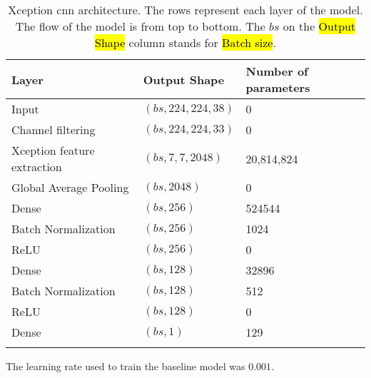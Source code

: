 \begin{longtable}{m{\mylengtha} | m{\mylengthb} | m{\mylengthc}}
    \hline
    Layer & Output Shape & Number of parameters \\
    \hline
    Input & $(bs, 224, 224, 38)$ & 0 \\
    \hline
    Channel filtering & $(bs, 224, 224, 33)$ & 0 \\
    \hline
    Xception feature extraction & $(bs, 7, 7, 2048)$ & 20,814,824 \\
    \hline
    Global Average Pooling & $(bs, 2048)$ & 0 \\
    \hline
    Dense & $(bs, 256)$ & 524544 \\
    \hline
    Batch Normalization & $(bs, 256)$ & 1024 \\
    \hline
    ReLU & $(bs, 256)$ & 0 \\
    \hline
    Dense & $(bs, 128)$ & 32896 \\
    \hline
    Batch Normalization & $(bs, 128)$ & 512 \\
    \hline
    ReLU & $(bs, 128)$ & 0 \\
    \hline
    Dense & $(bs, 1)$ & 129 \\
    \hline
  \caption{Xception \gls{cnn} architecture. The rows represent each layer of the model. The flow of the model is from top to bottom. The $bs$ on the \hl{Output Shape} column stands for \hl{Batch size}.}
  \label{table:metho:models:XC}
\end{longtable}

The learning rate used to train the baseline model was $0.001$.
